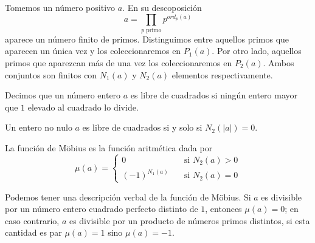 \documentclass[main.tex]{subfiles}
\begin{document}
Tomemos un n\'umero positivo $a$. En su descoposici\'on
$$a = \prod_{p \text{ primo}} p^{ord_p(a)}$$
aparece un n\'umero finito de primos. Distinguimos entre aquellos primos que aparecen un \'unica vez y los coleccionaremos en $P_1(a)$. Por otro lado, aquellos primos que aparezcan m\'as de una vez los coleccionaremos en $P_2(a)$. Ambos conjuntos son finitos con $N_1(a)$ y $N_2(a)$ elementos respectivamente.

\begin{defn}
    Decimos que un n\'umero entero $a$ es libre de cuadrados si ning\'un entero mayor que $1$ elevado al cuadrado lo divide.
\end{defn}

\begin{lemma}
    Un entero no nulo $a$ es libre de cuadrados si y solo si $N_2(|a|) = 0$.
\end{lemma}

\begin{defn}
    La funci\'on de M\"obius es la funci\'on aritm\'etica dada por
    \[
    \mu(a) = 
    \begin{cases}
        0 &\quad \text{si } N_2(a) > 0 \\
        (-1)^{N_1(a)} &\quad \text{si } N_2(a) = 0
    \end{cases}
    \]
\end{defn}

Podemos tener una descripci\'on verbal de la funci\'on de M\"obius. Si $a$ es divisible por un n\'umero entero cuadrado perfecto distinto de $1$, entonces $\mu(a) = 0$; en caso contrario, $a$ es divisible por un producto de n\'umeros primos distintos, si esta cantidad es par $\mu(a) = 1$ sino $\mu(a) = -1$.
\end{document}
